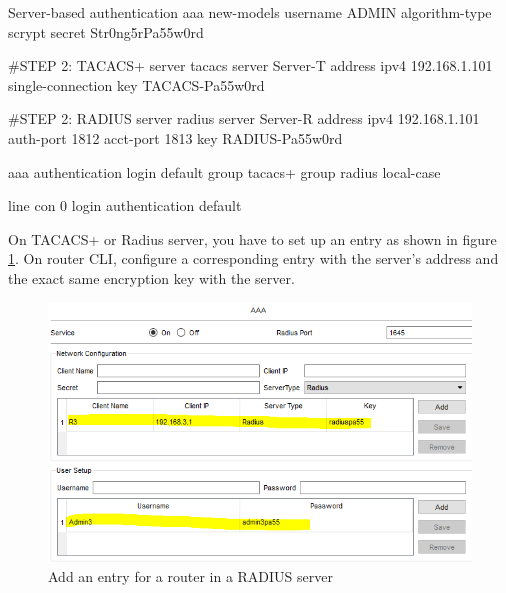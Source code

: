 %




\begin{sexylisting}{Server-based authentication}
aaa new-models
username ADMIN algorithm-type scrypt secret Str0ng5rPa55w0rd

#STEP 2: TACACS+ server
tacacs server Server-T
  address ipv4 192.168.1.101
  single-connection
  key TACACS-Pa55w0rd

#STEP 2: RADIUS server 
radius server Server-R
  address ipv4 192.168.1.101 auth-port 1812 acct-port 1813
  key RADIUS-Pa55w0rd

aaa authentication login default group tacacs+ group radius local-case

line con 0
	login authentication default 
\end{sexylisting}

On TACACS+ or  Radius  server, you have to set up an entry as shown in figure \ref{RADIUSserver}. On router CLI, configure a corresponding entry with the server's address and the exact same encryption key with the server.\\

\begin{figure}[hbtp]
\caption{Add an entry for a router in a RADIUS server}\label{RADIUSserver}
\centering
\includegraphics[scale=1]{pictures/RADIUSserver.PNG}
\end{figure}

